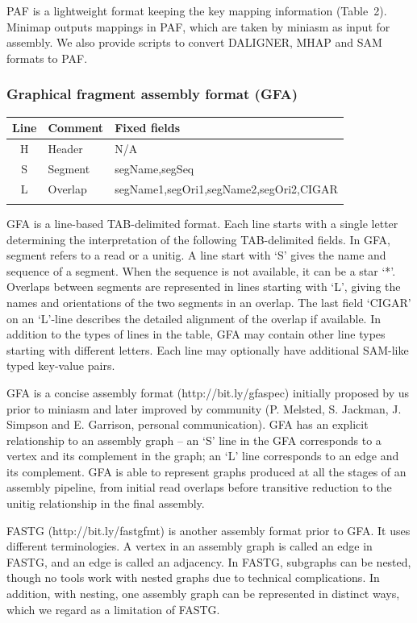 \documentclass{bioinfo}
\begin{document}
\begin{methods}
PAF is a lightweight format keeping the key mapping information (Table~2).
Minimap outputs mappings in PAF, which are taken by miniasm as input for
assembly. We also provide scripts to convert DALIGNER, MHAP and SAM formats to
PAF.

\subsubsection{Graphical fragment assembly format (GFA)}

\begin{table}[tb]
{\footnotesize
\begin{tabular}{clp{5.8cm}}
\toprule
Line & Comment & Fixed fields \\
\midrule
H    & Header  & N/A \\
S    & Segment & segName,segSeq \\
L    & Overlap & segName1,segOri1,segName2,segOri2,CIGAR \\
\botrule
\end{tabular}
}{GFA is a line-based TAB-delimited format. Each line starts with a single
letter determining the interpretation of the following TAB-delimited fields. In
GFA, segment refers to a read or a unitig. A line start with `S' gives the name
and sequence of a segment. When the sequence is not available, it can be a star
`*'. Overlaps between segments are represented in lines starting with `L',
giving the names and orientations of the two segments in an overlap. The last
field `CIGAR' on an `L'-line describes the detailed alignment of the overlap if
available. In addition to the types of lines in the table, GFA may contain
other line types starting with different letters. Each line may optionally have
additional SAM-like typed key-value pairs.}
\end{table}

GFA is a concise assembly format (http://bit.ly/gfaspec) initially proposed by
us prior to miniasm and later improved by community (P. Melsted, S.  Jackman,
J. Simpson and E. Garrison, personal communication). GFA has an explicit
relationship to an assembly graph -- an `S' line in the GFA corresponds to a
vertex and its complement in the graph; an `L' line corresponds to an edge and
its complement. GFA is able to represent graphs produced at all the stages of
an assembly pipeline, from initial read overlaps before transitive reduction to
the unitig relationship in the final assembly.

FASTG (http://bit.ly/fastgfmt) is another assembly format prior to GFA.
It uses different terminologies. A vertex in an assembly graph is called an
edge in FASTG, and an edge is called an adjacency. In FASTG, subgraphs can be
nested, though no tools work with nested graphs due to technical complications.
In addition, with nesting, one assembly graph can be represented in distinct
ways, which we regard as a limitation of FASTG.

\end{methods}
\end{document}
